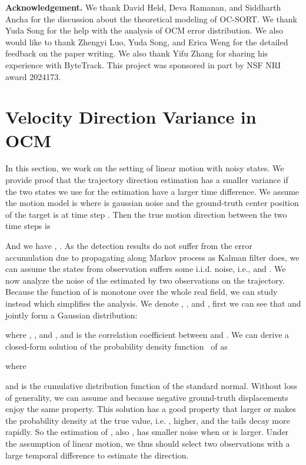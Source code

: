\documentclass[10pt,twocolumn,letterpaper]{article}
\begin{document}
\noindent \textbf{Acknowledgement.}
We thank David Held, Deva Ramanan, and Siddharth Ancha for the discussion about the theoretical modeling of OC-SORT. We thank Yuda Song for the help with the analysis of OCM error distribution. We also would like to thank Zhengyi Luo, Yuda Song, and Erica Weng for the detailed feedback on the paper writing. We also thank Yifu Zhang for sharing his experience with ByteTrack. This project was sponsored in part by NSF NRI award 2024173.

{\small


}

\clearpage
\appendix
\section{Velocity Direction Variance in OCM}
\label{sec:vdc_proof}

In this section, we work on the setting of linear motion with noisy states. We provide proof that the trajectory direction estimation has a smaller variance if the two states we use for the estimation have a larger time difference.  We assume the motion model is  where  is gaussian noise and the ground-truth center position of the target is  at time step . Then the true motion direction between the two time steps is 

And we have , . As the detection results do not suffer from the error accumulation due to propagating along Markov process as Kalman filter does, we can assume the states from observation suffers some i.i.d. noise, i.e.,  and  . We now analyze the noise of the estimated  by two observations on the trajectory. Because the function of  is monotone over the whole real field, we can study  instead which simplifies the analysis. We denote , , and , first we can see that  and  jointly form a Gaussian distribution: 

where , ,  and , and  is the correlation coefficient between  and . We can derive a closed-form solution of the probability density function~\cite{hinkley1969ratio} of  as 

where 

and  is the cumulative distribution function of the standard normal. Without loss of generality, we can assume  and  because negative ground-truth displacements enjoy the same property. This solution has a good property that larger  or  makes the probability density at the true value, i.e. , higher, and the tails decay more rapidly. So the estimation of , also , has smaller noise when   or  is larger. Under the assumption of linear motion, we thus should select two observations with a large temporal difference to estimate the direction.
\end{document}
